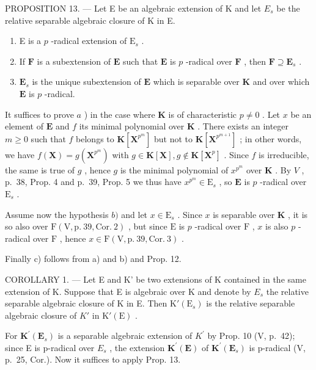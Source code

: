 PROPOSITION 13. --- Let E be an algebraic extension of K and let \(E_{s}\) be the relative separable algebraic closure of K in E.

\begin{enumerate}
\def\labelenumi{\alph{enumi})}
\item
  E is a \(p\) -radical extension of \(\mathrm{E}_s\) .
\item
  If \(\mathbf{F}\) is a subextension of \(\mathbf{E}\) such that \(\mathbf{E}\) is \(p\) -radical over \(\mathbf{F}\) , then \(\mathbf{F} \supseteq \mathbf{E}_s\) .
\item
  \(\mathbf{E}_s\) is the unique subextension of \(\mathbf{E}\) which is separable over \(\mathbf{K}\) and over which \(\mathbf{E}\) is \(p\) -radical.
\end{enumerate}

It suffices to prove \(a\) ) in the case where \(\mathbf{K}\) is of characteristic \(p \neq 0\) . Let \(x\) be an element of \(\mathbf{E}\) and \(f\) its minimal polynomial over \(\mathbf{K}\) . There exists an integer \(m \geqslant 0\) such that \(f\) belongs to \(\mathbf{K}[\mathbf{X}^{p^m}]\) but not to \(\mathbf{K}[\mathbf{X}^{p^{m+1}}]\) ; in other words, we have \(f(\mathbf{X}) = g(\mathbf{X}^{p^m})\) with \(g \in \mathbf{K}[\mathbf{X}], g \notin \mathbf{K}[\mathbf{X}^p]\) . Since \(f\) is irreducible, the same is true of \(g\) , hence \(g\) is the minimal polynomial of \(x^{p^m}\) over \(\mathbf{K}\) . By \(V\) , p.~38, Prop. 4 and p.~39, Prop. 5 we thus have \(x^{p^m} \in \mathrm{E}_s\) , so \(\mathbf{E}\) is \(p\) -radical over \(\mathrm{E}_s\) .

Assume now the hypothesis \(b)\) and let \(x \in \mathrm{E}_s\) . Since \(x\) is separable over \(\mathbf{K}\) , it is so also over \(\mathrm{F}(\mathrm{V}, \mathrm{p.~39}, \mathrm{Cor.~2})\) , but since \(\mathrm{E}\) is \(p\) -radical over \(\mathrm{F}\) , \(x\) is also \(p\) -radical over \(\mathrm{F}\) , hence \(x \in \mathrm{F}(\mathrm{V}, \mathrm{p.~39}, \mathrm{Cor.~3})\) .

Finally c) follows from a) and b) and Prop. 12.

COROLLARY 1. --- Let E and K' be two extensions of K contained in the same extension of K. Suppose that E is algebraic over K and denote by \(E_{s}\) the relative separable algebraic closure of K in E. Then \(\mathrm{K}'(\mathrm{E}_{s})\) is the relative separable algebraic closure of \(K'\) in \(\mathrm{K}'(\mathrm{E})\) .

For \(\mathbf{K}^{\prime}(\mathbf{E}_{s})\) is a separable algebraic extension of \(K^{\prime}\) by Prop. 10 (V, p.~42); since E is p-radical over \(E_{s}\) , the extension \(\mathbf{K}^{\prime}(\mathbf{E})\) of \(\mathbf{K}^{\prime}(\mathbf{E}_{s})\) is p-radical (V, p.~25, Cor.). Now it suffices to apply Prop. 13.

